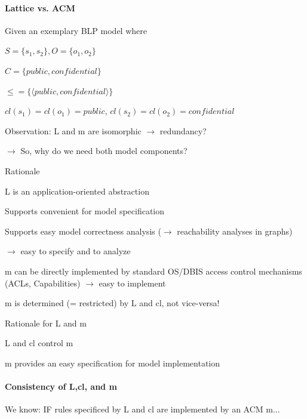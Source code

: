 \documentclass[a4paper]{article}
\begin{document}
\begin{multicols}{3}
    \paragraph{Lattice vs. ACM}
    Given an exemplary BLP model where
    \begin{itemize*}
        \item $S=\{s_1,s_2\}, O=\{o_1,o_2\}$
        \item $C=\{public,confidential\}$
        \item $\leq=\{⟨public,confidential⟩\}$
        \item $cl(s_1)=cl(o_1)=public$, $cl(s_2)=cl(o_2)=confidential$
        \item %
        \item Observation: L and m are isomorphic $\rightarrow$ redundancy?
        \item $\rightarrow$ So, why do we need both model components?
    \end{itemize*}

    Rationale
    \begin{itemize*}
        \item L is an application-oriented abstraction
        \begin{itemize*}
            \item Supports convenient for model specification
            \item Supports easy model correctness analysis ($\rightarrow$ reachability analyses in graphs)
            \item $\rightarrow$ easy to specify and to analyze
        \end{itemize*}
        \item m can be directly implemented by standard OS/DBIS access control mechanisms (ACLs, Capabilities) $\rightarrow$ easy to implement
        \item m is determined (= restricted) by L and cl, not vice-versa!
    \end{itemize*}

    Rationale for L and m
    \begin{itemize*}
        \item L and cl control m
        \item m provides an easy specification for model implementation
    \end{itemize*}

    \paragraph{Consistency of L,cl, and m}
    We know: IF rules specificed by L and cl are implemented by an ACM m...


\end{multicols}
\end{document}
